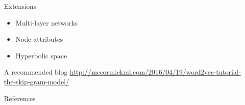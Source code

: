\documentclass{beamer}
\begin{document}
	\begin{frame}{Extensions}
		\begin{itemize}
			\item Multi-layer networks
			\item Node attributes
			\item Hyperbolic space
		\end{itemize}
	\end{frame}
	
	\begin{frame}{A recommended blog}
		\url{http://mccormickml.com/2016/04/19/word2vec-tutorial-the-skip-gram-model/}
	\end{frame}
	
	\begin{frame}[allowframebreaks]{References}
		
		
	\end{frame}
\end{document}
